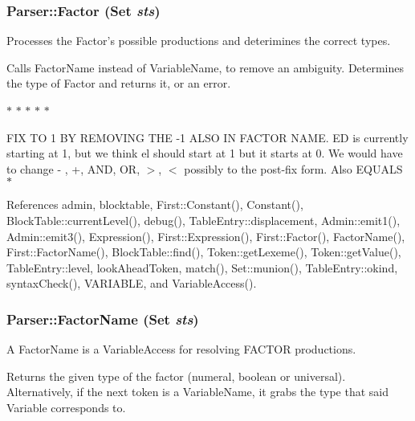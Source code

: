 \hypertarget{classParser_a071f2167f08d7bb2838ce98e67dfcc99}{
\subsubsection[{Factor}]{ Parser::Factor ({\bf Set} {\em sts})}}
\label{classParser_a071f2167f08d7bb2838ce98e67dfcc99}


Processes the Factor's possible productions and deterimines the correct types. 

Calls FactorName instead of VariableName, to remove an ambiguity. Determines the type of Factor and returns it, or an error. 

$\ast$ $\ast$ $\ast$ $\ast$ $\ast$

FIX TO 1 BY REMOVING THE -\/1 ALSO IN FACTOR NAME. ED is currently starting at 1, but we think el should start at 1 but it starts at 0. We would have to change -\/ , +, AND, OR, $>$, $<$ possibly to the post-\/fix form. Also EQUALS $\ast$



References admin, blocktable, First::Constant(), Constant(), BlockTable::currentLevel(), debug(), TableEntry::displacement, Admin::emit1(), Admin::emit3(), Expression(), First::Expression(), First::Factor(), FactorName(), First::FactorName(), BlockTable::find(), Token::getLexeme(), Token::getValue(), TableEntry::level, lookAheadToken, match(), Set::munion(), TableEntry::okind, syntaxCheck(), VARIABLE, and VariableAccess().

\hypertarget{classParser_a7f7f4a0f793d5c31f2a75ea10b426968}{
\subsubsection[{FactorName}]{ Parser::FactorName ({\bf Set} {\em sts})}}
\label{classParser_a7f7f4a0f793d5c31f2a75ea10b426968}


A FactorName is a VariableAccess for resolving FACTOR productions. 

Returns the given type of the factor (numeral, boolean or universal). Alternatively, if the next token is a VariableName, it grabs the type that said Variable corresponds to. 

